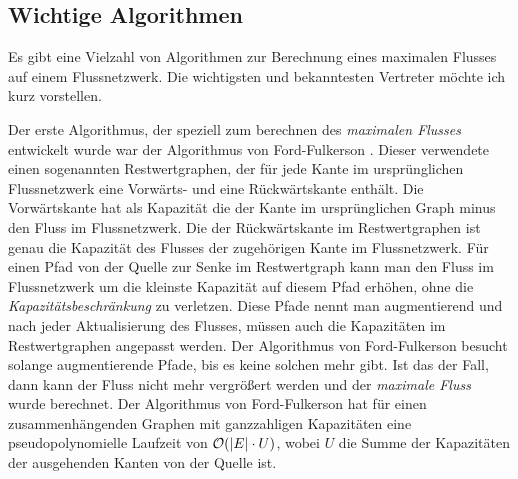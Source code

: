\begin{center}
\end{center}

\subsection{Wichtige Algorithmen}

Es gibt eine Vielzahl von Algorithmen zur Berechnung eines maximalen Flusses auf einem Flussnetzwerk. Die wichtigsten und bekanntesten Vertreter möchte ich kurz vorstellen. 

Der erste Algorithmus, der speziell zum berechnen des \emph{maximalen Flusses} entwickelt wurde war der Algorithmus von Ford-Fulkerson \citep{gt14}. Dieser verwendete einen sogenannten Restwertgraphen, der für jede Kante im ursprünglichen Flussnetzwerk eine Vorwärts- und eine Rückwärtskante enthält. Die Vorwärtskante hat als Kapazität die der Kante im ursprünglichen Graph minus den Fluss im Flussnetzwerk. Die der Rückwärtskante im Restwertgraphen ist genau die Kapazität des Flusses der zugehörigen Kante im Flussnetzwerk. Für einen Pfad von der Quelle zur Senke im Restwertgraph kann man den Fluss im Flussnetzwerk um die kleinste Kapazität auf diesem Pfad erhöhen, ohne die \emph{Kapazitätsbeschränkung} zu verletzen. Diese Pfade nennt man augmentierend und nach jeder Aktualisierung des Flusses, müssen auch die Kapazitäten im Restwertgraphen angepasst werden. Der Algorithmus von Ford-Fulkerson besucht solange augmentierende Pfade, bis es keine solchen mehr gibt. Ist das der Fall, dann kann der Fluss nicht mehr vergrößert werden und der \emph{maximale Fluss} wurde berechnet. Der Algorithmus von Ford-Fulkerson hat für einen zusammenhängenden Graphen mit ganzzahligen Kapazitäten eine pseudopolynomielle Laufzeit von $\mathcal{O}(|E|\cdot U)$, wobei $U$ die Summe der Kapazitäten der ausgehenden Kanten von der Quelle ist.

